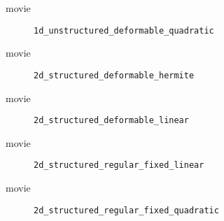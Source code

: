 

%
\begin{frame}{movie}
  \begin{figure}[h!]
    \caption{\lstinline{1d_unstructured_deformable_quadratic}}
  \end{figure} 
\end{frame}



%
\begin{frame}{movie}
  \begin{figure}[h!]
    \caption{\lstinline{2d_structured_deformable_hermite}}
  \end{figure} 
\end{frame}



%
\begin{frame}{movie}
  \begin{figure}[h!]
    \caption{\lstinline{2d_structured_deformable_linear}}
  \end{figure} 
\end{frame}



%
\begin{frame}{movie}
  \begin{figure}[h!]
    \caption{\lstinline{2d_structured_regular_fixed_linear}}
  \end{figure} 
\end{frame}



%
\begin{frame}{movie}
  \begin{figure}[h!]
    \caption{\lstinline{2d_structured_regular_fixed_quadratic}}
  \end{figure} 
\end{frame}

